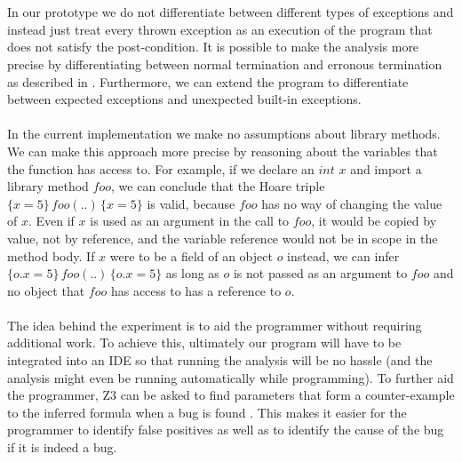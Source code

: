 \documentclass[a4paper, fleqn]{article}
\begin{document}
\\\\
In our prototype we do not differentiate between different types of exceptions and instead just treat every thrown exception as an execution of the program that does not satisfy the post-condition. It is possible to make the analysis more precise by differentiating between normal termination and erronous termination as described in \cite{guardedcommands}. Furthermore, we can extend the program to differentiate between expected exceptions and unexpected built-in exceptions.
\\\\
In the current implementation we make no assumptions about library methods. We can make this approach more precise by reasoning about the variables that the function has access to. For example, if we declare an $int$ $x$ and import a library method $f\!oo$, we can conclude that the Hoare triple $ \{x = 5\}\,f\!oo(..)\, \{x = 5\}$ is valid, because $f\!oo$ has no way of changing the value of $x$. Even if $x$ is used as an argument in the call to $f\!oo$, it would be copied by value, not by reference, and the variable reference would not be in scope in the method body. If $x$ were to be a field of an object $o$ instead, we can infer $ \{o.x = 5\}\,f\!oo(..)\, \{o.x = 5\}$ as long as $o$ is not passed as an argument to $f\!oo$ and no object that $f\!oo$ has access to has a reference to $o$.
\\\\
The idea behind the experiment is to aid the programmer without requiring additional work. To achieve this, ultimately our program will have to be integrated into an IDE so that running the analysis will be no hassle (and the analysis might even be running automatically while programming). To further aid the programmer, Z3 can be asked to find parameters that form a counter-example to the inferred formula when a bug is found \cite{z3}. This makes it easier for the programmer to identify false positives as well as to identify the cause of the bug if it is indeed a bug.
\end{document}

